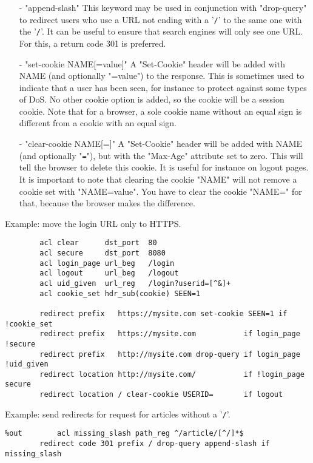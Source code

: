 \begin{description}
\begin{itemize}
      \item[-] "append-slash"
        This keyword may be used in conjunction with "drop-query" to redirect
        users who use a URL not ending with a '\verb|/|' to the same one with the '\verb|/|'.
        It can be useful to ensure that search engines will only see one URL.
        For this, a return code 301 is preferred.

      \item[-] "set-cookie NAME[=value]"
        A "Set-Cookie" header will be added with NAME (and optionally "=value")
        to the response. This is sometimes used to indicate that a user has
        been seen, for instance to protect against some types of DoS. No other
        cookie option is added, so the cookie will be a session cookie. Note
        that for a browser, a sole cookie name without an equal sign is
        different from a cookie with an equal sign.

      \item[-] "clear-cookie NAME[=]"
        A "Set-Cookie" header will be added with NAME (and optionally "\verb|=|"), but
        with the "Max-Age" attribute set to zero. This will tell the browser to
        delete this cookie. It is useful for instance on logout pages. It is
        important to note that clearing the cookie "NAME" will not remove a
        cookie set with "NAME=value". You have to clear the cookie "NAME=" for
        that, because the browser makes the difference.
      \end{itemize}
  \end{description}

  Example: move the login URL only to HTTPS.
  \begin{verbatim}
        acl clear      dst_port  80
        acl secure     dst_port  8080
        acl login_page url_beg   /login
        acl logout     url_beg   /logout
        acl uid_given  url_reg   /login?userid=[^&]+
        acl cookie_set hdr_sub(cookie) SEEN=1

        redirect prefix   https://mysite.com set-cookie SEEN=1 if !cookie_set
        redirect prefix   https://mysite.com           if login_page !secure
        redirect prefix   http://mysite.com drop-query if login_page !uid_given
        redirect location http://mysite.com/           if !login_page secure
        redirect location / clear-cookie USERID=       if logout
  \end{verbatim}

  Example: send redirects for request for articles without a '\verb|/|'.
  \begin{verbatim}
%out        acl missing_slash path_reg ^/article/[^/]*$
        redirect code 301 prefix / drop-query append-slash if missing_slash
  \end{verbatim}

